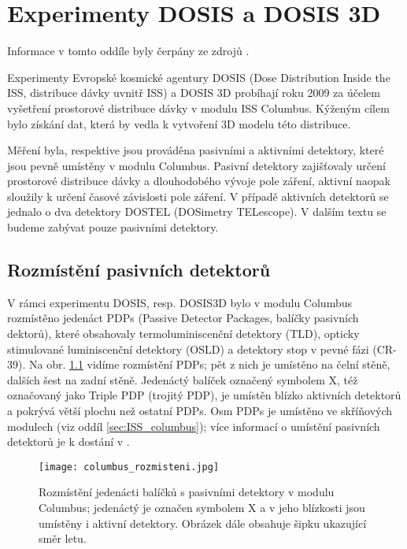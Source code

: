 \chapter{Experimenty DOSIS a DOSIS 3D}
Informace v tomto oddíle byly čerpány ze zdrojů \cite{dosis,dosis2}.

Experimenty Evropské kosmické agentury DOSIS (Dose Distribution Inside the ISS, distribuce dávky uvnitř ISS) a DOSIS 3D probíhají roku 2009 za účelem vyšetření prostorové distribuce dávky v modulu ISS Columbus. Kýženým cílem bylo získání dat, která by vedla k vytvoření 3D modelu této distribuce.

Měření byla, respektive jsou prováděna pasivními a aktivními detektory, které jsou pevně umístěny v modulu Columbus. Pasivní detektory zajišťovaly určení prostorové distribuce dávky a dlouhodobého vývoje pole záření, aktivní naopak sloužily k určení časové závislosti pole záření. V případě aktivních detektorů se jednalo o dva detektory DOSTEL (DOSimetry TELescope). V dalším textu se budeme zabývat pouze pasivními detektory.

\section{Rozmístění pasivních detektorů}
V rámci experimentu DOSIS, resp. DOSIS3D bylo v modulu Columbus rozmístěno jedenáct PDPs (Passive Detector Packages, balíčky pasivních dektorů), které obsahovaly termoluminiscenční detektory (TLD), opticky stimulované luminiscenční detektory (OSLD) a detektory stop v pevné fázi (CR-39). Na obr. \ref{fig:Columbus_rozmisteni} vidíme rozmístění PDPs; pět z nich je umístěno na čelní stěně, dalších šest na zadní stěně. Jedenáctý balíček označený symbolem X, též označovaný jako Triple PDP (trojitý PDP), je umístěn blízko aktivních detektorů a pokrývá větší plochu než ostatní PDPs. Osm PDPs je umístěno ve skříňových modulech (viz oddíl \ref{sec:ISS_columbus}); více informací o umístění pasivních detektorů je k dostání v \cite{dosis}. %
\begin{figure}[H]
  \centering
  \texttt{[image: columbus\_rozmisteni.jpg]}
  \caption{Rozmístění jedenácti balíčků s pasivními detektory v modulu Columbus; jedenáctý je označen symbolem X a v jeho blízkosti jsou umístěny i aktivní detektory. Obrázek dále obsahuje šipku ukazující směr letu. \cite{dosis}}
  \label{fig:Columbus_rozmisteni}
\end{figure}


